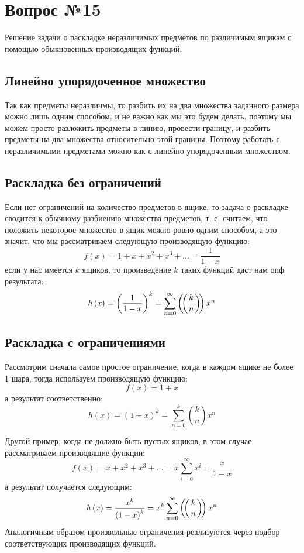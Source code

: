 \chapter{Вопрос №15}

Решение задачи о раскладке неразличимых предметов по различимым ящикам с помощью обыкновенных производящих функций.

\section{Линейно упорядоченное множество}

Так как предметы неразличмы, то разбить их на два множества заданного размера можно лишь одним способом, и не важно как мы это будем делать, поэтому мы можем просто разложить предметы в линию, провести границу, и разбить предметы на два множества относительно этой границы. Поэтому работать с неразличимыми предметами можно как с линейно упорядоченным множеством.

\section{Раскладка без ограничений}

Если нет ограничений на количество предметов в ящике, то задача о раскладке сводится к обычному разбиению множества предметов, т. е. считаем, что положить некоторое множество в ящик можно ровно одним способом, а это значит, что мы рассматриваем следующую производящую функцию:
\[
	f\left(x\right) = 1 + x + x^2 + x^3 + ... = \frac{1}{1 - x}
\]
если у нас имеется $k$ ящиков, то произведение $k$ таких функций даст нам опф результата:
\[
	h\left(x\right) = \left(\frac{1}{1-x}\right)^k = \sum_{n=0}^\infty \left(\negmedspace\left({{k}\atop{n}}\right)\negmedspace\right) x^n
\]

\section{Раскладка с ограничениями}

Рассмотрим сначала самое простое ограничение, когда в каждом ящике не более 1 шара, тогда используем производящую функцию:
\[
	f\left(x\right) = 1+x
\]
а результат соответственно:
\[
	h\left(x\right) = \left(1+x\right)^k = \sum_{n=0}^k \binom{k}{n} x^n
\]

Другой пример, когда не должно быть пустых ящиков, в этом случае рассматриваем производящие функции:
\[
	f\left(x\right) = x + x^2 +x^3 + ... = x\sum_{i=0}^\infty x^i = \frac{x}{1-x}
\]
а результат получается следующим:
\[
	h\left(x\right) = \frac{x^k}{\left(1-x\right)^k} = x^k\sum_{n=0}^\infty \left(\negmedspace\left({{k}\atop{n}}\right)\negmedspace\right)x^n
\]
Аналогичным образом произвольные ограничения реализуются через подбор соответствующих производящих функций.
